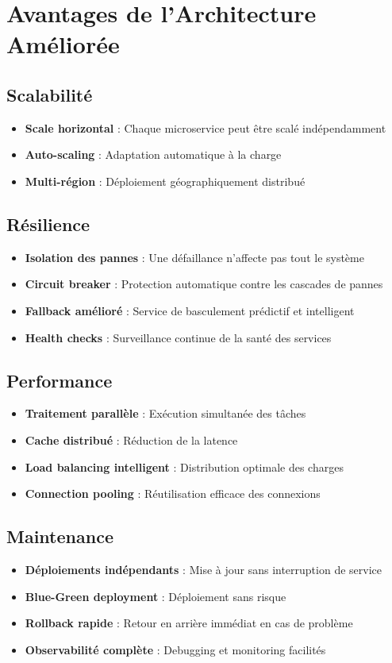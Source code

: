 \documentclass[12pt,a4paper]{article}
\begin{document}
\section{Avantages de l'Architecture Améliorée}

\subsection{Scalabilité}
\begin{itemize}
    \item \textbf{Scale horizontal} : Chaque microservice peut être scalé indépendamment
    \item \textbf{Auto-scaling} : Adaptation automatique à la charge
    \item \textbf{Multi-région} : Déploiement géographiquement distribué
\end{itemize}

\subsection{Résilience}
\begin{itemize}
    \item \textbf{Isolation des pannes} : Une défaillance n'affecte pas tout le système
    \item \textbf{Circuit breaker} : Protection automatique contre les cascades de pannes
    \item \textbf{Fallback amélioré} : Service de basculement prédictif et intelligent
    \item \textbf{Health checks} : Surveillance continue de la santé des services
\end{itemize}

\subsection{Performance}
\begin{itemize}
    \item \textbf{Traitement parallèle} : Exécution simultanée des tâches
    \item \textbf{Cache distribué} : Réduction de la latence
    \item \textbf{Load balancing intelligent} : Distribution optimale des charges
    \item \textbf{Connection pooling} : Réutilisation efficace des connexions
\end{itemize}

\subsection{Maintenance}
\begin{itemize}
    \item \textbf{Déploiements indépendants} : Mise à jour sans interruption de service
    \item \textbf{Blue-Green deployment} : Déploiement sans risque
    \item \textbf{Rollback rapide} : Retour en arrière immédiat en cas de problème
    \item \textbf{Observabilité complète} : Debugging et monitoring facilités
\end{itemize}
\end{document}
